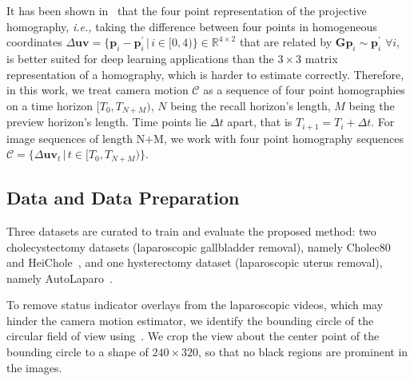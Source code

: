 It has been shown in~\cite{detone2016deep} that the four point representation of the projective homography, \emph{i.e.,}  taking the difference between four points in homogeneous coordinates $\Delta\mathbf{uv} = \{\mathbf{p}_i - \mathbf{p}^\prime_i\,|\,i \in [0, 4)\} \in \mathbb{R}^{4\times2}$ that are related by $\mathbf{G}\mathbf{p}_i \sim \mathbf{p}^\prime_i\,\,\forall i$, is better suited for deep learning applications than the $3\times3$ matrix representation of a homography, which is harder to estimate correctly.
%
Therefore, in this work, we treat camera motion $\mathcal{C}$ as a sequence of four point homographies on a time horizon $[T_0, T_{N+M})$, $N$ being the recall horizon's length, $M$ being the preview horizon's length. Time points 
lie $\Delta t$ apart, that is $T_{i+1} = T_{i} + \Delta t$. For image sequences of length $\text{N+M}$,
we work with
four point homography sequences $\mathcal{C}=\{\Delta\mathbf{uv}_t \,|\, t\in[T_0, T_{N+M})\}$.



\subsection{Data and Data Preparation}
\label{c4:sec:data_and_data_preparation}
Three datasets are
curated
to train and evaluate the proposed method: two cholecystectomy datasets (laparoscopic gallbladder removal), namely Cholec80~\cite{twinanda2016endonet} and HeiChole~\cite{wagner2023comparative}, and one hysterectomy dataset (laparoscopic uterus removal), namely AutoLaparo~\cite{wang2022autolaparo}.


To remove status indicator overlays from the laparoscopic videos, which may hinder the camera motion estimator, we identify the bounding circle of the circular field of view using~\cite{Budd2022RapidDataset}. We crop the view about the center point of the bounding circle to a shape of $240\times320$, so that no black regions are prominent in the images.


